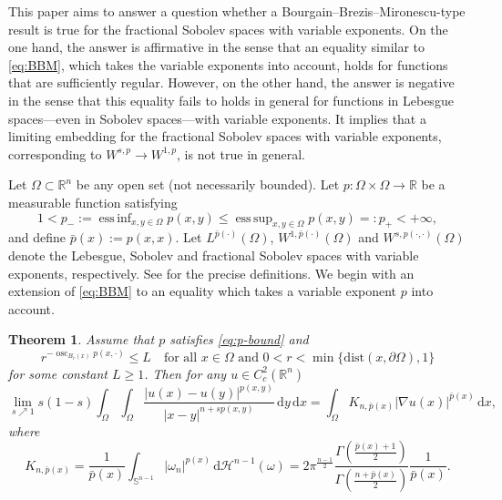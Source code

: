 \documentclass[11pt]{amsart}
\theoremstyle{plain}
\newtheorem{theorem}{Theorem}[section]
\theoremstyle{definition}
\numberwithin{equation}{section}
\DeclareMathOperator*{\esssup}{ess\,sup}
\DeclareMathOperator*{\essinf}{ess\,inf}
\DeclareMathOperator{\osc}{osc}
\begin{document}
This paper aims to answer a question whether a Bourgain--Brezis--Mironescu-type result is true for the fractional Sobolev spaces with variable exponents. On the one hand, the answer is affirmative in the sense that an equality similar to \eqref{eq:BBM}, which takes the variable exponents into account, holds for functions that are sufficiently regular. However, on the other hand, the answer is negative in the sense that this equality fails to holds in general for functions in Lebesgue spaces---even in Sobolev spaces---with variable exponents. It implies that a limiting embedding for the fractional Sobolev spaces with variable exponents, corresponding to $W^{s, p} \to W^{1, p}$, is not true in general.

Let $\Omega \subset \mathbb{R}^{n}$ be any open set (not necessarily bounded). Let $p: \Omega \times \Omega \to \mathbb{R}$ be a measurable function satisfying
\begin{equation} \label{eq:p-bound}
1 < p_{-} := \essinf_{x, y \in \Omega} p(x, y) \leq \esssup_{x, y \in \Omega} p(x, y) =: p_{+} < +\infty,
\end{equation}
and define $\bar{p}(x) := p(x, x)$. Let $L^{\bar{p}(\cdot)}(\Omega)$, $W^{1, \bar{p}(\cdot)}(\Omega)$ and $W^{s, p(\cdot, \cdot)}(\Omega)$ denote the Lebesgue, Sobolev and fractional Sobolev spaces with variable exponents, respectively. See  for the precise definitions. We begin with an extension of \eqref{eq:BBM} to an equality which takes a variable exponent $p$ into account.

\begin{theorem} \label{thm:conv}
Assume that $p$ satisfies \eqref{eq:p-bound} and
\begin{equation} \label{eq:p-log-Holder}
r^{-\osc_{B_{r}(x)} p(x, \cdot)} \leq L \quad \text{for all } x \in \Omega \text{ and } 0 < r < \min \lbrace \mathrm{dist}(x, \partial \Omega), 1 \rbrace
\end{equation}
for some constant $L \geq 1$. Then for any $u \in C^{2}_{c}(\mathbb{R}^{n})$
\begin{equation} \label{eq:equality}
\lim_{s \nearrow 1} s(1-s) \int_{\Omega} \int_{\Omega} \frac{|u(x)-u(y)|^{p(x, y)}}{|x-y|^{n+sp(x, y)}} \,\mathrm{d}y \,\mathrm{d}x = \int_{\Omega} K_{n, \bar{p}(x)} |\nabla u(x)|^{\bar{p}(x)} \,\mathrm{d}x,
\end{equation}
where
\begin{equation*}
K_{n, \bar{p}(x)} = \frac{1}{\bar{p}(x)} \int_{\mathbb{S}^{n-1}} |\omega_{n}|^{p(x)} \,\mathrm{d}\mathcal{H}^{n-1}(\omega) = 2\pi^{\frac{n-1}{2}} \frac{\Gamma(\frac{\bar{p}(x)+1}{2})}{\Gamma(\frac{n+\bar{p}(x)}{2})} \frac{1}{\bar{p}(x)}.
\end{equation*}
\end{theorem}
\end{document}
